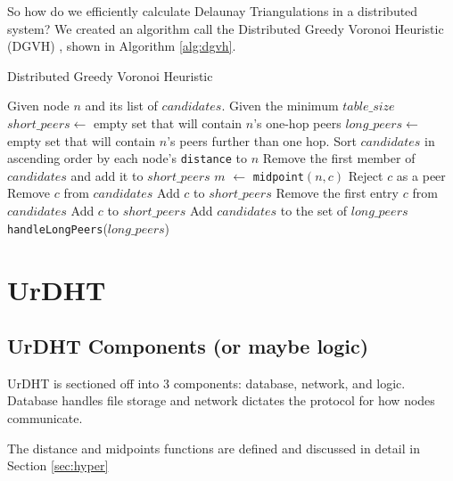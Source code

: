 \documentclass[11pt,conference]{IEEEtran}
\begin{document}
So how do we efficiently calculate Delaunay Triangulations in a distributed system?
We created an algorithm call the Distributed Greedy Voronoi Heuristic (DGVH) \cite{dgvh}, shown in Algorithm \ref{alg:dgvh}.


\begin{algorithm} %
	\caption{Distributed Greedy Voronoi Heuristic}
	\label{alg:dgvh}
	\scriptsize
	\begin{algorithmic}[1]  %
		\STATE Given node $n$ and its list of $candidates$.
		\STATE Given the minimum $table\_size$
		\STATE $short\_peers \leftarrow$ empty set that will contain $n$'s one-hop peers
		\STATE $long\_peers \leftarrow$ empty set that will contain $n$'s peers further than one hop.
		\STATE Sort $candidates$ in ascending order by each node's \texttt{distance} to $n$
		\STATE Remove the first member of $candidates$ and add it to $short\_peers$
			\STATE $m$ $ \leftarrow $ \texttt{midpoint}$( n, c )$
				\STATE Reject $c$ as a peer
			\ELSE
				\STATE Remove $c$ from $candidates$
				\STATE Add $c$ to $short\_peers$
			\ENDIF
		\ENDFOR
			\STATE Remove the first entry $c$ from $candidates$
			\STATE Add $c$ to $short\_peers$
		\ENDWHILE
		\STATE Add $candidates$ to the set of $long\_peers$	
		\STATE \texttt{handleLongPeers}($long\_peers$)
	\end{algorithmic}
\end{algorithm} 

\section{UrDHT}
\label{sec:urdht}
	\subsection{UrDHT Components (or maybe logic)}
	
	UrDHT is sectioned off into 3 components: database, network, and logic.
	Database handles file storage and network dictates the protocol for how nodes communicate.
	
	The distance and midpoints functions are defined and discussed in detail in Section \ref{sec:hyper}
	
\end{document}
